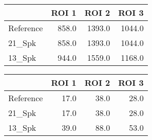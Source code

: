 \begin{tabular}{lrrr}
\toprule
{} &  ROI 1 &   ROI 2 &   ROI 3 \\
\midrule
Reference &  858.0 &  1393.0 &  1044.0 \\
21\_Spk    &  858.0 &  1393.0 &  1044.0 \\
13\_Spk    &  944.0 &  1559.0 &  1168.0 \\
\bottomrule
\end{tabular}
\begin{tabular}{lrrr}
\toprule
{} &  ROI 1 &  ROI 2 &  ROI 3 \\
\midrule
Reference &   17.0 &   38.0 &   28.0 \\
21\_Spk    &   17.0 &   38.0 &   28.0 \\
13\_Spk    &   39.0 &   88.0 &   53.0 \\
\bottomrule
\end{tabular}

